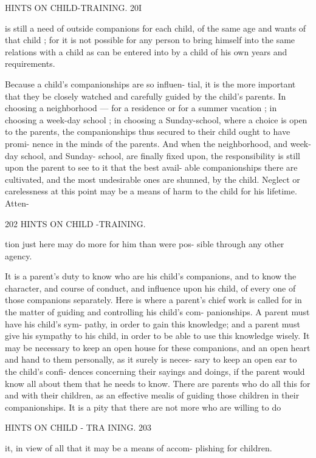 \documentclass[
]{book}
\begin{document}
HINTS ON CHILD-TRAINING. 20I

is still a need of outside companions for each child, of the same age and wants of that child ; for it is not possible for any person to bring himself into the same relations with a child as can be entered into by a child of his own years and requirements.

Because a child's companionships are so influen- tial, it is the more important that they be closely watched and carefully guided by the child's parents. In choosing a neighborhood --- for a residence or for a summer vacation ; in choosing a week-day school ; in choosing a Sunday-school, where a choice is open to the parents, the companionships thus secured to their child ought to have promi- nence in the minds of the parents. And when the neighborhood, and week-day school, and Sunday- school, are finally fixed upon, the responsibility is still upon the parent to see to it that the best avail- able companionships there are cultivated, and the most undesirable ones are shunned, by the child. Neglect or carelessness at this point may be a means of harm to the child for his lifetime. Atten-

202 HINTS ON CHILD -TRAINING.

tion just here may do more for him than were pos- sible through any other agency.

It is a parent's duty to know who are his child's companions, and to know the character, and course of conduct, and influence upon his child, of every one of those companions separately. Here is where a parent's chief work is called for in the matter of guiding and controlling his child's com- panionships. A parent must have his child's sym- pathy, in order to gain this knowledge; and a parent must give his sympathy to his child, in order to be able to use this knowledge wisely. It may be necessary to keep an open house for these companions, and an open heart and hand to them personally, as it surely is neces- sary to keep an open ear to the child's confi- dences concerning their sayings and doings, if the parent would know all about them that he needs to know. There are parents who do all this for and with their children, as an effective mealis of guiding those children in their companionships. It is a pity that there are not more who are willing to do

HINTS ON CHILD - TRA INING. 203

it, in view of all that it may be a means of accom- plishing for children.
\end{document}
